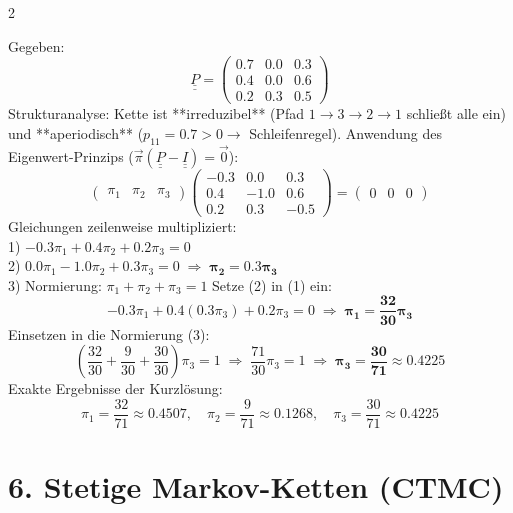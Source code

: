 \documentclass[a4paper, 9pt]{extarticle}
\begin{document}
\begin{multicols*}{2}
\begin{tcolorbox}[title={Klausuraufgabe 1: Handrechnung}, colframe=markovviolet, colback=markovviolet!5, colbacktitle=markovviolet]
Gegeben:
$$\underline{\underline{P}} = \begin{pmatrix} 0.7 & 0.0 & 0.3 \\ 0.4 & 0.0 & 0.6 \\ 0.2 & 0.3 & 0.5 \end{pmatrix}$$
Strukturanalyse: Kette ist **irreduzibel** (Pfad $1 \rightarrow 3 \rightarrow 2 \rightarrow 1$ schließt alle ein) und **aperiodisch** ($p_{11} = 0.7 > 0 \rightarrow$ Schleifenregel).
\smallskip
Anwendung des Eigenwert-Prinzips ($\vec{\pi}(\underline{\underline{P}} - \underline{\underline{I}}) = \vec{0}$):
$$\begin{pmatrix} \pi_1 & \pi_2 & \pi_3 \end{pmatrix} \begin{pmatrix} -0.3 & 0.0 & 0.3 \\ 0.4 & -1.0 & 0.6 \\ 0.2 & 0.3 & -0.5 \end{pmatrix} = \begin{pmatrix} 0 & 0 & 0 \end{pmatrix}$$
Gleichungen zeilenweise multipliziert:
\\1) $-0.3\pi_1 + 0.4\pi_2 + 0.2\pi_3 = 0$
\\2) $0.0\pi_1 - 1.0\pi_2 + 0.3\pi_3 = 0 \;\Rightarrow\; \bm{\pi_2 = 0.3\pi_3}$
\\3) Normierung: $\pi_1 + \pi_2 + \pi_3 = 1$
\smallskip
Setze (2) in (1) ein:
$$-0.3\pi_1 + 0.4(0.3\pi_3) + 0.2\pi_3 = 0 \;\Rightarrow\; \bm{\pi_1 = \frac{32}{30}\pi_3}$$
Einsetzen in die Normierung (3):
$$\left(\frac{32}{30} + \frac{9}{30} + \frac{30}{30}\right)\pi_3 = 1 \;\Rightarrow\; \frac{71}{30}\pi_3 = 1 \;\Rightarrow\; \bm{\pi_3 = \frac{30}{71} \approx 0.4225}$$
Exakte Ergebnisse der Kurzlösung:
$$\pi_1 = \frac{32}{71} \approx 0.4507, \quad \pi_2 = \frac{9}{71} \approx 0.1268, \quad \pi_3 = \frac{30}{71} \approx 0.4225$$
\end{tcolorbox}

\section*{6. Stetige Markov-Ketten (CTMC)}


\end{multicols*}
\end{document}
